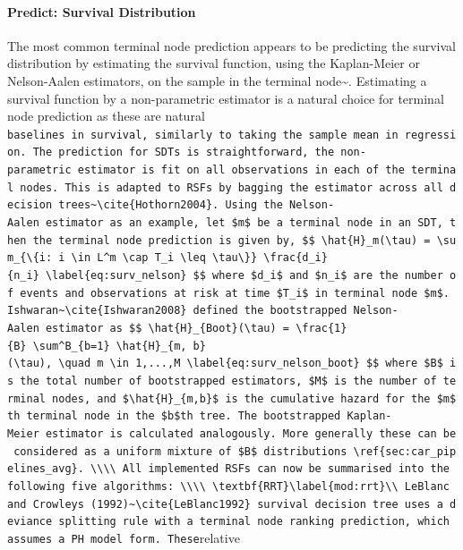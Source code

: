 \documentclass[
  letterpaper,
]{scrbook}
\let\oldparagraph\paragraph
\renewcommand{\paragraph}[1]{\oldparagraph{#1}\mbox{}}
\theoremstyle{plain}
\theoremstyle{definition}
\theoremstyle{remark}
\begin{document}
\paragraph{Predict: Survival Distribution}

The most common terminal node prediction appears to be predicting the
survival distribution by estimating the survival function, using the
Kaplan-Meier or Nelson-Aalen estimators, on the sample in the terminal
node\textasciitilde{}\cite{Hothorn2004, Ishwaran2008, LeBlanc1993, Segal1988}.
Estimating a survival function by a non-parametric estimator is a
natural choice for terminal node prediction as these are natural
\texttt{baselines\textquotesingle{}\ in\ survival,\ similarly\ to\ taking\ the\ sample\ mean\ in\ regression.\ The\ prediction\ for\ SDTs\ is\ straightforward,\ the\ non-parametric\ estimator\ is\ fit\ on\ all\ observations\ in\ each\ of\ the\ terminal\ nodes.\ This\ is\ adapted\ to\ RSFs\ by\ bagging\ the\ estimator\ across\ all\ decision\ trees\textasciitilde{}\textbackslash{}cite\{Hothorn2004\}.\ Using\ the\ Nelson-Aalen\ estimator\ as\ an\ example,\ let\ \$m\$\ be\ a\ terminal\ node\ in\ an\ SDT,\ then\ the\ terminal\ node\ prediction\ is\ given\ by,\ \$\$\ \textbackslash{}hat\{H\}\_m(\textbackslash{}tau)\ =\ \textbackslash{}sum\_\{\textbackslash{}\{i:\ i\ \textbackslash{}in\ L\^{}m\ \textbackslash{}cap\ T\_i\ \textbackslash{}leq\ \textbackslash{}tau\textbackslash{}\}\}\ \textbackslash{}frac\{d\_i\}\{n\_i\}\ \textbackslash{}label\{eq:surv\_nelson\}\ \$\$\ where\ \$d\_i\$\ and\ \$n\_i\$\ are\ the\ number\ of\ events\ and\ observations\ at\ risk\ at\ time\ \$T\_i\$\ in\ terminal\ node\ \$m\$.\ Ishwaran\textasciitilde{}\textbackslash{}cite\{Ishwaran2008\}\ defined\ the\ bootstrapped\ Nelson-Aalen\ estimator\ as\ \$\$\ \textbackslash{}hat\{H\}\_\{Boot\}(\textbackslash{}tau)\ =\ \textbackslash{}frac\{1\}\{B\}\ \textbackslash{}sum\^{}B\_\{b=1\}\ \textbackslash{}hat\{H\}\_\{m,\ b\}(\textbackslash{}tau),\ \textbackslash{}quad\ m\ \textbackslash{}in\ 1,...,M\ \textbackslash{}label\{eq:surv\_nelson\_boot\}\ \$\$\ where\ \$B\$\ is\ the\ total\ number\ of\ bootstrapped\ estimators,\ \$M\$\ is\ the\ number\ of\ terminal\ nodes,\ and\ \$\textbackslash{}hat\{H\}\_\{m,b\}\$\ is\ the\ cumulative\ hazard\ for\ the\ \$m\$th\ terminal\ node\ in\ the\ \$b\$th\ tree.\ The\ bootstrapped\ Kaplan-Meier\ estimator\ is\ calculated\ analogously.\ More\ generally\ these\ can\ be\ considered\ as\ a\ uniform\ mixture\ of\ \$B\$\ distributions\ \textbackslash{}ref\{sec:car\_pipelines\_avg\}.\ \textbackslash{}\textbackslash{}\textbackslash{}\textbackslash{}\ All\ implemented\ RSFs\ can\ now\ be\ summarised\ into\ the\ following\ five\ algorithms:\ \textbackslash{}\textbackslash{}\textbackslash{}\textbackslash{}\ \textbackslash{}textbf\{RRT\}\textbackslash{}label\{mod:rrt\}\textbackslash{}\textbackslash{}\ LeBlanc\ and\ Crowley\textquotesingle{}s\ (1992)\textasciitilde{}\textbackslash{}cite\{LeBlanc1992\}\ survival\ decision\ tree\ uses\ a\ deviance\ splitting\ rule\ with\ a\ terminal\ node\ ranking\ prediction,\ which\ assumes\ a\ PH\ model\ form.\ These}relative
\end{document}
